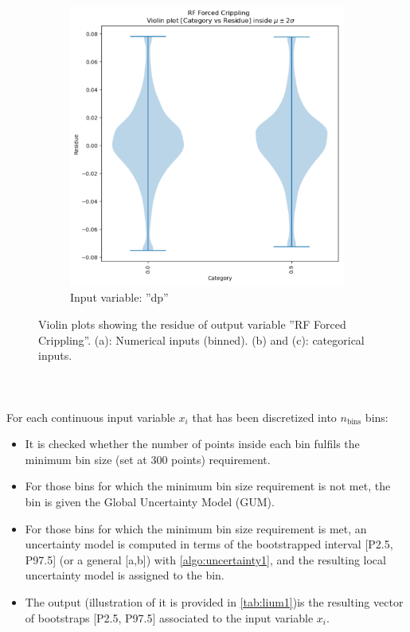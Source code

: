 \begin{figure}[!htb]
\begin{subfigure}[b]{0.4\textwidth}
		\includegraphics[width=\textwidth]{Figures/uncertainty/violines4.png}
		\caption{Input variable: ''dp''}
		\label{fig:subviolins3}
	\end{subfigure}
	\caption{Violin plots showing the residue of output variable ''RF Forced Crippling''. (a): Numerical inputs (binned). (b) and (c): categorical inputs.}
	\label{fig:violins3}
\end{figure}
%
\paragraph{ \\}
For each continuous input variable $x_i$ that has been discretized into $n_{\text{bins}}$ bins:
\begin{itemize}
	\item It is checked whether the number of points inside each bin fulfils the minimum bin size (set at 300 points) requirement.
	\item For those bins for which the minimum bin size requirement is not met, the bin is given the Global Uncertainty Model (GUM).
	\item For those bins for which the minimum bin size requirement is met, an uncertainty model is computed in terms of the bootstrapped interval [P2.5, P97.5] (or a general [a,b]) with \autoref{algo:uncertainty1}, and the resulting local uncertainty model is assigned to the bin.
	\item The output (illustration of it is provided in \autoref{tab:lium1})is the resulting vector of bootstraps [P2.5, P97.5] associated to the input variable $x_i$.\\
\end{itemize}

